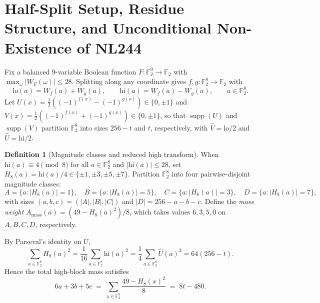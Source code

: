\documentclass[11pt]{article}
\theoremstyle{definition}
\newtheorem{definition}[theorem]{Definition}
\newcommand{\F}{\mathbb{F}}
\newcommand{\supp}{\operatorname{supp}}
\begin{document}
\section{Half-Split Setup, Residue Structure, and Unconditional Non-Existence of NL244}
\label{sec:setup}

Fix a balanced $9$-variable Boolean function $F : \F_2^9 \to \F_2$ with $\max_{\omega} |W_F(\omega)| \le 28$.
Splitting along any coordinate gives $f, g : \F_2^8 \to \F_2$ with
\[
  \mathrm{lo}(a) = W_f(a) + W_g(a), \qquad \mathrm{hi}(a) = W_f(a) - W_g(a), \qquad a \in \F_2^8.
\]
Let $U(x) = \frac{1}{2}((-1)^{f(x)} - (-1)^{g(x)}) \in \{0, \pm 1\}$ and $V(x) = \frac{1}{2}((-1)^{f(x)} + (-1)^{g(x)}) \in \{0, \pm 1\}$, so that $\supp(U)$ and $\supp(V)$ partition $\F_2^8$ into sizes $256 - t$ and $t$, respectively, with $\widehat{V} = \mathrm{lo}/2$ and $\widehat{U} = \mathrm{hi}/2$.

\begin{definition}[Magnitude classes and reduced high transform]
\label{def:classes}
When $\mathrm{hi}(a) \equiv 4 \pmod 8$ for all $a \in \F_2^8$ and $|\mathrm{hi}(a)| \le 28$, set $H_8(a) = \mathrm{hi}(a)/4 \in \{\pm 1, \pm 3, \pm 5, \pm 7\}$.
Partition $\F_2^8$ into four pairwise-disjoint magnitude classes:
\[
  A = \{a : |H_8(a)| = 1\},\quad
  B = \{a : |H_8(a)| = 5\},\quad
  C = \{a : |H_8(a)| = 3\},\quad
  D = \{a : |H_8(a)| = 7\},
\]
with sizes $(a, b, c) = (|A|, |B|, |C|)$ and $|D| = 256 - a - b - c$.
Define the \emph{mass weight} $A_{\mathrm{mass}}(a) = (49 - H_8(a)^2)/8$, which takes values $6, 3, 5, 0$ on $A, B, C, D$, respectively.
\end{definition}

By Parseval's identity on $U$,
\[
  \sum_{a \in \F_2^8} H_8(a)^2 = \frac{1}{16}\sum_{a \in \F_2^8} \mathrm{hi}(a)^2 = \frac{1}{4}\sum_{a \in \F_2^8} \widehat{U}(a)^2 = 64(256 - t).
\]
Hence the total high-block mass satisfies
\begin{equation}
\label{eq:total-mass}
  6a + 3b + 5c \;=\; \sum_{x \in \F_2^8} \frac{49 - H_8(x)^2}{8} \;=\; 8t - 480.
\end{equation}
\end{document}
